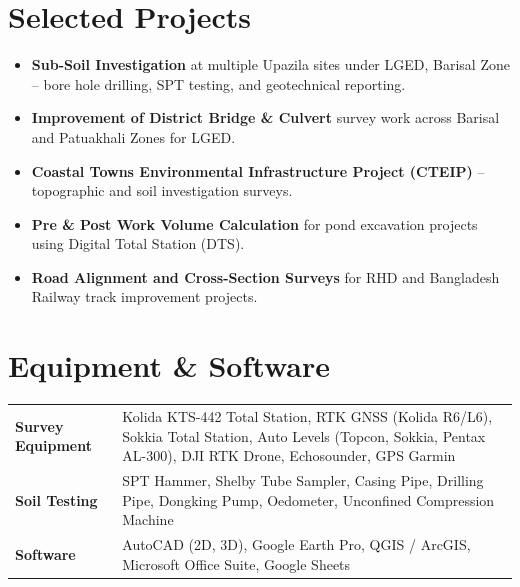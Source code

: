 \documentclass[10.5pt, a4paper]{article}
\begin{document}
\section{Selected Projects}

\begin{itemize}[leftmargin=1.2em, itemsep=1pt, topsep=1pt, parsep=0pt]
  \item \textbf{Sub-Soil Investigation} at multiple Upazila sites under LGED, Barisal Zone -- bore hole drilling, SPT testing, and geotechnical reporting.
  \item \textbf{Improvement of District Bridge \& Culvert} survey work across Barisal and Patuakhali Zones for LGED.
  \item \textbf{Coastal Towns Environmental Infrastructure Project (CTEIP)} -- topographic and soil investigation surveys.
  \item \textbf{Pre \& Post Work Volume Calculation} for pond excavation projects using Digital Total Station (DTS).
  \item \textbf{Road Alignment and Cross-Section Surveys} for RHD and Bangladesh Railway track improvement projects.
\end{itemize}

\vspace{1pt}

\section{Equipment \& Software}

\vspace{1pt}
{\small
\begin{tabularx}{\linewidth}{@{} p{3cm} X @{}}
  \textbf{\color{ddseNavy}Survey Equipment} & Kolida KTS-442 Total Station, RTK GNSS (Kolida R6/L6), Sokkia Total Station, Auto Levels (Topcon, Sokkia, Pentax AL-300), DJI RTK Drone, Echosounder, GPS Garmin \\[2pt]
  \textbf{\color{ddseNavy}Soil Testing} & SPT Hammer, Shelby Tube Sampler, Casing Pipe, Drilling Pipe, Dongking Pump, Oedometer, Unconfined Compression Machine \\[2pt]
  \textbf{\color{ddseNavy}Software} & AutoCAD (2D, 3D), Google Earth Pro, QGIS / ArcGIS, Microsoft Office Suite, Google Sheets \\
\end{tabularx}
}

\vspace{1pt}
\end{document}
